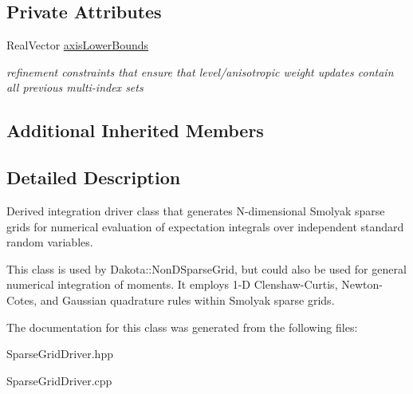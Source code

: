 \subsection*{Private Attributes}
\begin{DoxyCompactItemize}
\item 
Real\+Vector \hyperlink{classPecos_1_1SparseGridDriver_a6ee9597c940b14bb917322ac28926aa4}{axis\+Lower\+Bounds}\label{classPecos_1_1SparseGridDriver_a6ee9597c940b14bb917322ac28926aa4}

\begin{DoxyCompactList}\small\item\em refinement constraints that ensure that level/anisotropic weight updates contain all previous multi-\/index sets \end{DoxyCompactList}\end{DoxyCompactItemize}
\subsection*{Additional Inherited Members}


\subsection{Detailed Description}
Derived integration driver class that generates N-\/dimensional Smolyak sparse grids for numerical evaluation of expectation integrals over independent standard random variables. 

This class is used by Dakota\+::\+Non\+D\+Sparse\+Grid, but could also be used for general numerical integration of moments. It employs 1-\/D Clenshaw-\/\+Curtis, Newton-\/\+Cotes, and Gaussian quadrature rules within Smolyak sparse grids. 

The documentation for this class was generated from the following files\+:\begin{DoxyCompactItemize}
\item 
Sparse\+Grid\+Driver.\+hpp\item 
Sparse\+Grid\+Driver.\+cpp\end{DoxyCompactItemize}
